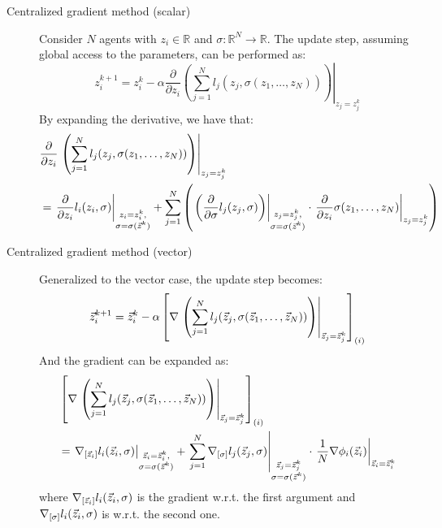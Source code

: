 \begin{description}
    \item[Centralized gradient method (scalar)] 
        Consider $N$ agents with $z_i \in \mathbb{R}$ and $\sigma: \mathbb{R}^N \rightarrow \mathbb{R}$. The update step, assuming global access to the parameters, can be performed as:
        \[
            z_i^{k+1} = z_i^k - \alpha \frac{\partial}{\partial z_i} \left.\left( \sum_{j=1}^{N} l_j(z_j, \sigma(z_1, \dots, z_N)) \right) \right|_{z_j=z_j^k}
        \]
        By expanding the derivative, we have that:
        \[
            \begin{split}
                &\frac{\partial}{\partial z_i} \left.\left( \sum_{j=1}^{N} l_j(z_j, \sigma(z_1, \dots, z_N)) \right) \right|_{z_j=z_j^k} \\
                &= 
                    \left.\frac{\partial}{\partial z_i} l_i(z_i, \sigma) \right|_{\substack{z_i = z_i^k,\\\sigma = \sigma({\vec{z}}^k)}} + 
                    \sum_{j=1}^{N} \left( \left. \left( \frac{\partial}{\partial \sigma} l_j(z_j, \sigma) \right)\right|_{\substack{z_j = z_j^k,\\\sigma = \sigma({\vec{z}}^k)}} 
                    \cdot
                    \left.\frac{\partial}{\partial z_i} \sigma(z_1, \dots, z_N)\right|_{\substack{z_j=z_j^k}} \right)
            \end{split}
        \]

    \item[Centralized gradient method (vector)] 
        Generalized to the vector case, the update step becomes:
        \[
            {\vec{z}}_i^{k+1} = {\vec{z}}_i^k - \alpha \left[ \nabla \left.\left( \sum_{j=1}^{N} l_j({\vec{z}}_j, \sigma({\vec{z}}_1, \dots, {\vec{z}}_N)) \right) \right|_{{\vec{z}}_j={\vec{z}}_j^k} \right]_{(i)}
        \]
        And the gradient can be expanded as:
        \[
            \begin{split}
                &\left[ \nabla \left.\left( \sum_{j=1}^{N} l_j({\vec{z}}_j, \sigma({\vec{z}}_1, \dots, {\vec{z}}_N)) \right) \right|_{{\vec{z}}_j={\vec{z}}_j^k} \right]_{(i)} \\
                &= 
                    \left.\nabla_{[{\vec{z}}_i]} l_i({\vec{z}}_i, \sigma)\right|_{\substack{{\vec{z}}_i={\vec{z}}_i^k,\\\sigma=\sigma({\vec{z}}^k)}} +
                    \left.\sum_{j=1}^{N} \nabla_{[\sigma]} l_j({\vec{z}}_j, \sigma)\right|_{\substack{{\vec{z}}_j={\vec{z}}_j^k\\\sigma=\sigma({\vec{z}}^k)}} \cdot
                    \left.\frac{1}{N}\nabla \phi_i({\vec{z}}_i)\right|_{{\vec{z}}_i={\vec{z}}_i^k} 
            \end{split}
        \]
        where $\nabla_{[{\vec{z}}_i]} l_i({\vec{z}}_i, \sigma)$ is the gradient w.r.t. the first argument and $\nabla_{[\sigma]} l_i({\vec{z}}_i, \sigma)$ is w.r.t. the second one.
\end{description}



